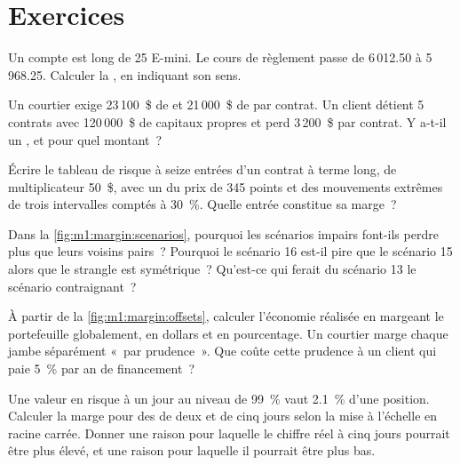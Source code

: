\section{Exercices}

\begin{exercise}[$\star$]\label{exo:m1:margin:1}
Un compte est long de 25 E-mini. Le cours de règlement passe de 6\,012.50 à
5\,968.25. Calculer la , en indiquant son sens.
\end{exercise}

\begin{exercise}[$\star$]\label{exo:m1:margin:2}
Un courtier exige 23\,100~\$ de  et 21\,000~\$ de  par
contrat. Un client détient 5 contrats avec 120\,000~\$ de capitaux propres et perd
3\,200~\$ par contrat. Y a-t-il un , et pour quel montant~?
\end{exercise}

\begin{exercise}[$\star$]\label{exo:m1:margin:3}
Écrire le tableau de risque à seize entrées d'un contrat à terme long, de multiplicateur
50~\$, avec un  du prix de 345 points et des mouvements extrêmes de trois intervalles
comptés à 30~\%. Quelle entrée constitue sa marge~?
\end{exercise}

\begin{exercise}[$\star\star$]\label{exo:m1:margin:4}
Dans la \cref{fig:m1:margin:scenarios}, pourquoi les scénarios impairs font-ils perdre plus que
leurs voisins pairs~? Pourquoi le scénario 16 est-il pire que le scénario 15 alors que le
strangle est symétrique~? Qu'est-ce qui ferait du scénario 13 le scénario contraignant~?
\end{exercise}

\begin{exercise}[$\star\star$]\label{exo:m1:margin:5}
À partir de la \cref{fig:m1:margin:offsets}, calculer l'économie réalisée en margeant
le portefeuille globalement, en dollars et en pourcentage. Un courtier marge chaque jambe
séparément «~par prudence~». Que coûte cette prudence à un client
qui paie 5~\% par an de financement~?
\end{exercise}

\begin{exercise}[$\star\star$]\label{exo:m1:margin:6}
Une valeur en risque à un jour au niveau de 99~\% vaut 2.1~\% d'une position. Calculer la marge
pour des  de deux et de cinq jours selon la mise à l'échelle en racine carrée.
Donner une raison pour laquelle le chiffre réel à cinq jours pourrait être plus élevé, et une raison
pour laquelle il pourrait être plus bas.
\end{exercise}

